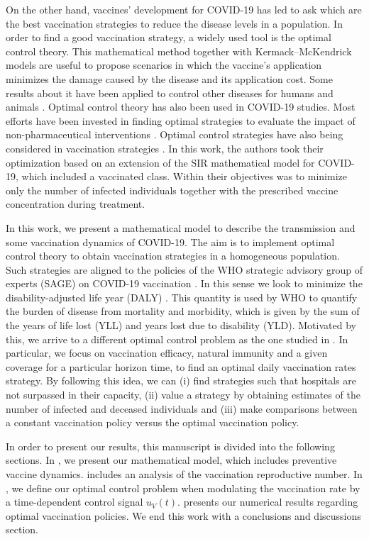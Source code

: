     On the other hand, vaccines' development for COVID-19 has led to ask which
are the best vaccination strategies to reduce the disease levels in a
population. In order to find a good vaccination strategy, a widely used tool is
the optimal control theory. This mathematical method together with
Kermack--McKendrick models are useful to propose scenarios in which the
vaccine's application minimizes the damage caused by the disease and its
application cost. Some results about it have been applied to control other
diseases for humans and animals
\cite{Asano2008,Rodrigues2014,Malik2016,Jaberi2014}. Optimal control theory has
also been used in COVID-19 studies. Most efforts have been invested in finding
optimal strategies to evaluate the impact of non-pharmaceutical interventions
\cite{Madubueze2020,Perkins2020,Ullah2020}. Optimal control strategies have also
being considered in vaccination strategies \cite{Barbosa2020}. In this work, the
authors took their optimization based on an extension of the SIR mathematical
model for COVID-19, which included a vaccinated class. Within their objectives
was to minimize only the number of infected individuals together with the
prescribed vaccine concentration during treatment.

    In this work, we present a mathematical model to describe the transmission
and some vaccination dynamics of COVID-19. The aim is to implement optimal
control theory to obtain vaccination strategies in a homogeneous population.
Such strategies are aligned to the policies of the WHO strategic advisory group
of experts (SAGE) on COVID-19 vaccination \cite{sage2020}. In this sense we look
to minimize the disability-adjusted life year (DALY) \cite{WhoDALY}. This
quantity is used by WHO to quantify the burden of disease from mortality and
morbidity, which is given by the sum of the years of life lost (YLL) and years
lost due to disability (YLD). Motivated by this, we arrive to a different
optimal control problem as the one studied in \cite{Barbosa2020}. In particular,
we focus on vaccination efficacy, natural immunity and a given coverage for a
particular horizon time, to find an optimal daily vaccination rates strategy. By
following this idea, we can (i) find strategies such that hospitals are not
surpassed in their capacity, (ii) value a strategy by obtaining estimates of the
number of infected and deceased individuals and (iii) make comparisons between a
constant vaccination policy versus the optimal vaccination policy.

    In order to present our results, this manuscript is divided into the
following sections. In , we present our
mathematical model, which includes preventive vaccine dynamics.
 includes an analysis of the vaccination reproductive
number. In , we define our optimal control
problem when modulating the vaccination rate by a time-dependent control signal
$u_V(t)$.  presents our numerical results
regarding optimal vaccination policies. We end this work with a conclusions and
discussions section.